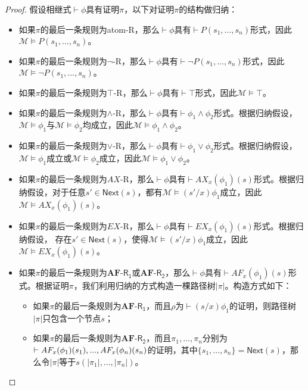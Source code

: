 \begin{proof}
	假设相继式$\vdash\phi$具有证明$\pi$，以下对证明$\pi$的结构做归纳：
	\begin{itemize}
		\item 如果$\pi$的最后一条规则为\textsf{atom-R}，那么$\vdash\phi$具有$\vdash P(s_1,...,s_n)$形式，因此$\mathcal{M}\models P(s_1,...,s_n)$。
		\item 如果$\pi$的最后一条规则为$\neg$-\textsf{R}，那么$\vdash\phi$具有$\vdash \neg P(s_1,...,s_n)$形式，因此$\mathcal{M}\models \neg P(s_1,...,s_n)$。
		\item 如果$\pi$的最后一条规则为$\top$-\textsf{R}，那么$\vdash\phi$具有$\vdash \top$形式，因此$\mathcal{M}\models \top$。
		\item 如果$\pi$的最后一条规则为$\wedge$-\textsf{R}，那么$\vdash\phi$具有$\vdash \phi_1\wedge\phi_2$形式。根据归纳假设，$\mathcal{M}\models \phi_1$与$\mathcal{M}\models \phi_2$均成立，因此$\mathcal{M}\models \phi_1\wedge\phi_2$。
		\item 如果$\pi$的最后一条规则为$\vee$-\textsf{R}，那么$\vdash\phi$具有$\vdash \phi_1\vee\phi_2$形式。根据归纳假设，$\mathcal{M}\models \phi_1$成立或$\mathcal{M}\models \phi_2$成立，因此$\mathcal{M}\models \phi_1\vee\phi_2$。
		
		\item 如果$\pi$的最后一条规则为$AX$-\textsf{R}，那么$\vdash\phi$具有$\vdash AX_x(\phi_1)(s)$形式。根据归纳假设，对于任意$s'\in\mathsf{Next}(s)$，都有$\mathcal{M}\models (s'/x)\phi_1$成立，因此$\mathcal{M}\models AX_x(\phi_1)(s)$。
		
		\item 如果$\pi$的最后一条规则为$EX$-\textsf{R}，那么$\vdash\phi$具有$\vdash EX_x(\phi_1)(s)$形式。根据归纳假设，  存在$s'\in\mathsf{Next}(s)$，使得$\mathcal{M}\models (s'/x)\phi_1$成立，因此$\mathcal{M}\models EX_x(\phi_1)(s)$。
		
		\item 如果$\pi$的最后一条规则为$\mathbf{AF}$-$\mathsf{R_1}$或$\mathbf{AF}$-$\mathsf{R_2}$，那么$\vdash\phi$具有$\vdash AF_x(\phi_1)(s)$形式。根据证明$\pi$，我们利用归纳的方式构造一棵路径树$|\pi|$。构造方式如下：
		\begin{itemize}		
			\item 如果$\pi$的最后一条规则为$\mathbf{AF}$-$\mathsf{R_1}$，而且$\rho$为$\vdash(s/x)\phi_1$的证明，则路径树$|\pi|$只包含一个节点$s$；
			
			\item 如果$\pi$的最后一条规则为$\mathbf{AF}$-$\mathsf{R_2}$，而且$\pi_1,...,\pi_n$分别为$\vdash AF_x(\phi_1)(s_1),\\...,AF_x(\phi_n)(s_n)$的证明，其中$\{s_1,...,s_n\}=\mathsf{Next}(s)$，那么令$|\pi|$等于$s(|\pi_1|,...,|\pi_n|)$。
		\end{itemize}
		

\end{itemize}
\end{proof}
